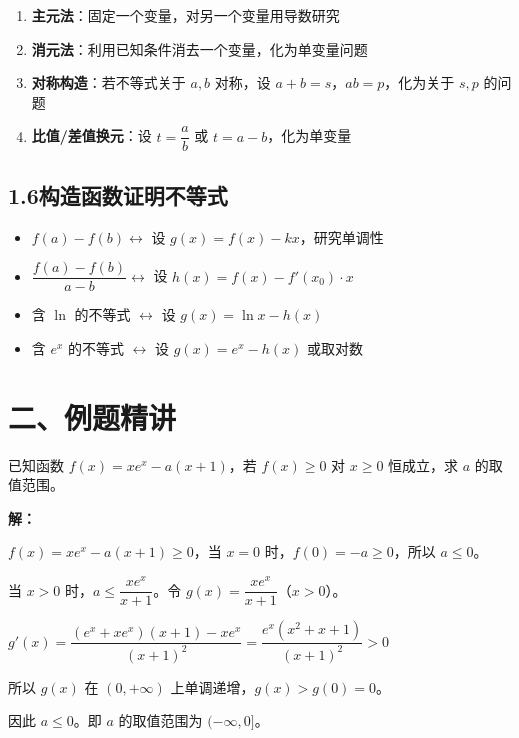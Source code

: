 \documentclass[12pt, a4paper]{ctexart}
\begin{document}
\begin{knowledgebox}[双变量问题的处理策略]
\begin{enumerate}[leftmargin=2em]
  \item \textbf{主元法}：固定一个变量，对另一个变量用导数研究
  \item \textbf{消元法}：利用已知条件消去一个变量，化为单变量问题
  \item \textbf{对称构造}：若不等式关于 $a,b$ 对称，设 $a+b=s$，$ab=p$，化为关于 $s,p$ 的问题
  \item \textbf{比值/差值换元}：设 $t=\dfrac{a}{b}$ 或 $t=a-b$，化为单变量
\end{enumerate}
\end{knowledgebox}

\subsection*{1.6\quad 构造函数证明不等式}

\begin{knowledgebox}[构造函数的常见模式]
\begin{itemize}[leftmargin=2em]
  \item $f(a)-f(b) \longleftrightarrow$ 设 $g(x)=f(x)-kx$，研究单调性
  \item $\dfrac{f(a)-f(b)}{a-b} \longleftrightarrow$ 设 $h(x)=f(x)-f'(x_0)\cdot x$
  \item 含 $\ln$ 的不等式 $\longleftrightarrow$ 设 $g(x)=\ln x - h(x)$
  \item 含 $e^x$ 的不等式 $\longleftrightarrow$ 设 $g(x)=e^x - h(x)$ 或取对数
\end{itemize}
\end{knowledgebox}

\section*{\textcolor{examorange}{二、例题精讲}}

\begin{examplebox}[【例题1】隐零点代换求参数范围]
已知函数 $f(x)=xe^x-a(x+1)$，若 $f(x)\geq 0$ 对 $x\geq 0$ 恒成立，求 $a$ 的取值范围。

\textbf{解：}

$f(x)=xe^x-a(x+1)\geq 0$，当 $x=0$ 时，$f(0)=-a\geq 0$，所以 $a\leq 0$。

当 $x>0$ 时，$a\leq \dfrac{xe^x}{x+1}$。令 $g(x)=\dfrac{xe^x}{x+1}$（$x>0$）。

$g'(x)=\dfrac{(e^x+xe^x)(x+1)-xe^x}{(x+1)^2}=\dfrac{e^x(x^2+x+1)}{(x+1)^2}>0$

所以 $g(x)$ 在 $(0,+\infty)$ 上单调递增，$g(x)>g(0)=0$。

因此 $a\leq 0$。即 $a$ 的取值范围为 $\boxed{(-\infty, 0]}$。
\end{examplebox}
\end{document}

